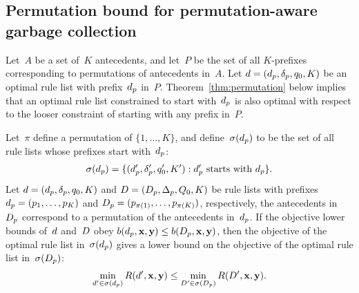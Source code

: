 \subsection{Permutation bound for permutation-aware garbage collection}
\label{sec:permutation}

Let~$A$ be a set of~$K$ antecedents, and let~$P$ be the set of all
$K$-prefixes corresponding to permutations of antecedents in~$A$.
%
Let ${{d} = (d_p, \delta_p, q_0, K)}$ be an optimal rule list
with prefix~$d_p$ in~$P$.
%
Theorem~\ref{thm:permutation} below implies that
an optimal rule list constrained to start with~$d_p$
is also optimal with respect to the looser constraint of
starting with any prefix in~$P$.

\begin{theorem}
\label{thm:permutation}
Let~$\pi$ define a permutation of ${\{1, \dots, K\}}$,
and define~$\sigma(d_p)$ to be the set of all rule lists
whose prefixes start with~$d_p$:
\begin{align}
\StartsWith(\Prefix) =
\{(\Prefix', \Labels', \Default', K') : \Prefix' \textnormal{ starts with } \Prefix \}.
\end{align}
Let ${{d} = (d_p, \delta_p, q_0, K)}$
and ${{D} = (D_p, \Delta_p, Q_0, K)}$
be rule lists with prefixes ${d_p = (p_1, \dots, p_K)}$
and ${D_p = (p_{\pi(1)}, \dots, p_{\pi(K)})}$,
respectively, \ie the antecedents in~$D_p$
correspond to a permutation of the antecedents in~$d_p$.
%
If the objective lower bounds of~${d}$ and~${D}$
obey ${b(d_p, \mathbf{x}, \mathbf{y}) \le b(D_p, \mathbf{x}, \mathbf{y})}$,
then the objective of the optimal rule list in~$\sigma(d_p)$ gives a
lower bound on the objective of the optimal rule list in~$\sigma(D_p)$:
\begin{align}
\min_{\RL' \in \StartsWith(\Prefix)} \Obj(\RL', \x, \y)
\le \min_{\RLB' \in \StartsWith(\PrefixB)} \Obj(\RLB', \x, \y).
\label{eq:permutation}
\end{align}
\end{theorem}

